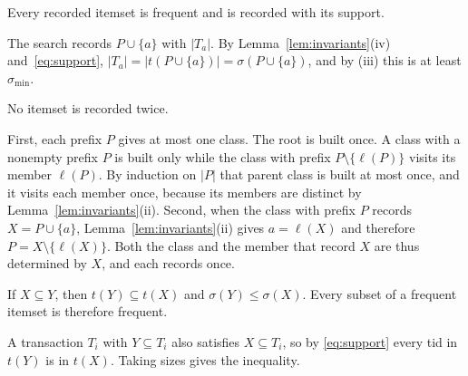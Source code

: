 \begin{lemma}
\label{lem:exact}
Every recorded itemset is frequent and is recorded with its support.
\end{lemma}
\begin{IEEEproof}
The search records $P \cup \{a\}$ with $|T_a|$. By
Lemma~\ref{lem:invariants}(iv) and~\eqref{eq:support}, $|T_a| = |t(P \cup \{a\})| =
\sigma(P \cup \{a\})$, and by (iii) this is at least $\sigma_{\min}$.
\end{IEEEproof}

\begin{lemma}[No duplicates]
\label{lem:unique}
No itemset is recorded twice.
\end{lemma}
\begin{IEEEproof}
First, each prefix $P$ gives at most one class. The root is built once. A class with a
nonempty prefix $P$ is built only while the class with prefix $P \setminus \{\ell(P)\}$
visits its member $\ell(P)$. By induction on $|P|$ that parent class is built at most
once, and it visits each member once, because its members are distinct by
Lemma~\ref{lem:invariants}(ii). Second, when the class with prefix $P$ records
$X = P \cup \{a\}$, Lemma~\ref{lem:invariants}(ii) gives $a = \ell(X)$ and therefore
$P = X \setminus \{\ell(X)\}$. Both the class and the member that record $X$ are thus
determined by $X$, and each records once.
\end{IEEEproof}

\begin{lemma}
\label{lem:antimonotone}
If $X \subseteq Y$, then $t(Y) \subseteq t(X)$ and $\sigma(Y) \le \sigma(X)$. Every subset
of a frequent itemset is therefore frequent.
\end{lemma}
\begin{IEEEproof}
A transaction $T_i$ with $Y \subseteq T_i$ also satisfies $X \subseteq T_i$, so by
\eqref{eq:support} every tid in $t(Y)$ is in $t(X)$. Taking sizes gives the inequality.
\end{IEEEproof}

